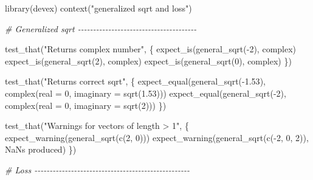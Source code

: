 \documentclass[
]{book}
\newenvironment{Shaded}{\begin{snugshade}}{\end{snugshade}}
\newcommand{\AttributeTok}[1]{\textcolor[rgb]{0.77,0.63,0.00}{#1}}
\newcommand{\CommentTok}[1]{\textcolor[rgb]{0.56,0.35,0.01}{\textit{#1}}}
\newcommand{\DecValTok}[1]{\textcolor[rgb]{0.00,0.00,0.81}{#1}}
\newcommand{\FloatTok}[1]{\textcolor[rgb]{0.00,0.00,0.81}{#1}}
\newcommand{\FunctionTok}[1]{\textcolor[rgb]{0.00,0.00,0.00}{#1}}
\newcommand{\NormalTok}[1]{#1}
\newcommand{\SpecialCharTok}[1]{\textcolor[rgb]{0.00,0.00,0.00}{#1}}
\newcommand{\StringTok}[1]{\textcolor[rgb]{0.31,0.60,0.02}{#1}}
\begin{document}
\begin{Shaded}
\begin{Highlighting}[]
\FunctionTok{library}\NormalTok{(devex)}
\FunctionTok{context}\NormalTok{(}\StringTok{"generalized sqrt and loss"}\NormalTok{)}

\CommentTok{\# Generalized sqrt {-}{-}{-}{-}{-}{-}{-}{-}{-}{-}{-}{-}{-}{-}{-}{-}{-}{-}{-}{-}{-}{-}{-}{-}{-}{-}{-}{-}{-}{-}{-}{-}{-}{-}{-}{-}{-}{-}{-}}

\FunctionTok{test\_that}\NormalTok{(}\StringTok{"Returns complex number"}\NormalTok{, \{}
  \FunctionTok{expect\_is}\NormalTok{(}\FunctionTok{general\_sqrt}\NormalTok{(}\SpecialCharTok{{-}}\DecValTok{2}\NormalTok{), }\StringTok{\textquotesingle{}complex\textquotesingle{}}\NormalTok{)}
  \FunctionTok{expect\_is}\NormalTok{(}\FunctionTok{general\_sqrt}\NormalTok{(}\DecValTok{2}\NormalTok{), }\StringTok{\textquotesingle{}complex\textquotesingle{}}\NormalTok{)}
  \FunctionTok{expect\_is}\NormalTok{(}\FunctionTok{general\_sqrt}\NormalTok{(}\DecValTok{0}\NormalTok{), }\StringTok{\textquotesingle{}complex\textquotesingle{}}\NormalTok{)}
\NormalTok{\})}

\FunctionTok{test\_that}\NormalTok{(}\StringTok{"Returns correct sqrt"}\NormalTok{, \{}
  \FunctionTok{expect\_equal}\NormalTok{(}\FunctionTok{general\_sqrt}\NormalTok{(}\SpecialCharTok{{-}}\FloatTok{1.53}\NormalTok{), }\FunctionTok{complex}\NormalTok{(}\AttributeTok{real =} \DecValTok{0}\NormalTok{, }\AttributeTok{imaginary =} \FunctionTok{sqrt}\NormalTok{(}\FloatTok{1.53}\NormalTok{)))}
  \FunctionTok{expect\_equal}\NormalTok{(}\FunctionTok{general\_sqrt}\NormalTok{(}\SpecialCharTok{{-}}\DecValTok{2}\NormalTok{), }\FunctionTok{complex}\NormalTok{(}\AttributeTok{real =} \DecValTok{0}\NormalTok{, }\AttributeTok{imaginary =} \FunctionTok{sqrt}\NormalTok{(}\DecValTok{2}\NormalTok{)))}
\NormalTok{\})}

\FunctionTok{test\_that}\NormalTok{(}\StringTok{"Warnings for vectors of length \textgreater{} 1"}\NormalTok{, \{}
  \FunctionTok{expect\_warning}\NormalTok{(}\FunctionTok{general\_sqrt}\NormalTok{(}\FunctionTok{c}\NormalTok{(}\DecValTok{2}\NormalTok{, }\DecValTok{0}\NormalTok{)))}
  \FunctionTok{expect\_warning}\NormalTok{(}\FunctionTok{general\_sqrt}\NormalTok{(}\FunctionTok{c}\NormalTok{(}\SpecialCharTok{{-}}\DecValTok{2}\NormalTok{, }\DecValTok{0}\NormalTok{, }\DecValTok{2}\NormalTok{)), }\StringTok{\textquotesingle{}NaNs produced\textquotesingle{}}\NormalTok{)}
\NormalTok{\})}

\CommentTok{\# Loss {-}{-}{-}{-}{-}{-}{-}{-}{-}{-}{-}{-}{-}{-}{-}{-}{-}{-}{-}{-}{-}{-}{-}{-}{-}{-}{-}{-}{-}{-}{-}{-}{-}{-}{-}{-}{-}{-}{-}{-}{-}{-}{-}{-}{-}{-}{-}{-}{-}{-}{-}}


\end{Highlighting}
\end{Shaded}
\end{document}
